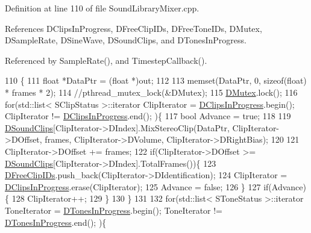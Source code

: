 Definition at line 110 of file Sound\+Library\+Mixer.\+cpp.



References D\+Clips\+In\+Progress, D\+Free\+Clip\+I\+Ds, D\+Free\+Tone\+I\+Ds, D\+Mutex, D\+Sample\+Rate, D\+Sine\+Wave, D\+Sound\+Clips, and D\+Tones\+In\+Progress.



Referenced by Sample\+Rate(), and Timestep\+Callback().


\begin{DoxyCode}
110                                                                                                            
                                  \{
111     \textcolor{keywordtype}{float} *DataPtr = (\textcolor{keywordtype}{float} *)out;
112     
113     memset(DataPtr, 0, \textcolor{keyword}{sizeof}(\textcolor{keywordtype}{float}) * frames * 2);
114     \textcolor{comment}{//pthread\_mutex\_lock(&DMutex);}
115     \hyperlink{classCSoundLibraryMixer_a955562a0638df831413a1c6b8860f9fb}{DMutex}.lock();
116     \textcolor{keywordflow}{for}(std::list< SClipStatus >::iterator ClipIterator = \hyperlink{classCSoundLibraryMixer_aad014b54093b2aeee4d7014ab329dbf9}{DClipsInProgress}.begin(); 
      ClipIterator != \hyperlink{classCSoundLibraryMixer_aad014b54093b2aeee4d7014ab329dbf9}{DClipsInProgress}.end(); )\{
117         \textcolor{keywordtype}{bool} Advance = \textcolor{keyword}{true};
118         
119         \hyperlink{classCSoundLibraryMixer_af4a006eacdcd590fad6e02cddaf197c2}{DSoundClips}[ClipIterator->DIndex].MixStereoClip(DataPtr, ClipIterator->DOffset, frames, 
      ClipIterator->DVolume, ClipIterator->DRightBias);
120         
121         ClipIterator->DOffset += frames;
122         \textcolor{keywordflow}{if}(ClipIterator->DOffset >= \hyperlink{classCSoundLibraryMixer_af4a006eacdcd590fad6e02cddaf197c2}{DSoundClips}[ClipIterator->DIndex].TotalFrames())\{
123             \hyperlink{classCSoundLibraryMixer_a32956ae09580a1ae4c9c037f0f7b5c0b}{DFreeClipIDs}.push\_back(ClipIterator->DIdentification);   
124             ClipIterator = \hyperlink{classCSoundLibraryMixer_aad014b54093b2aeee4d7014ab329dbf9}{DClipsInProgress}.erase(ClipIterator);
125             Advance = \textcolor{keyword}{false};
126         \}
127         \textcolor{keywordflow}{if}(Advance)\{
128             ClipIterator++;   
129         \}
130     \}
131     
132     \textcolor{keywordflow}{for}(std::list< SToneStatus >::iterator ToneIterator = \hyperlink{classCSoundLibraryMixer_a39bb9c811d842a282b6b7058ac7dfe1c}{DTonesInProgress}.begin(); 
      ToneIterator != \hyperlink{classCSoundLibraryMixer_a39bb9c811d842a282b6b7058ac7dfe1c}{DTonesInProgress}.end(); )\{

\end{DoxyCode}
